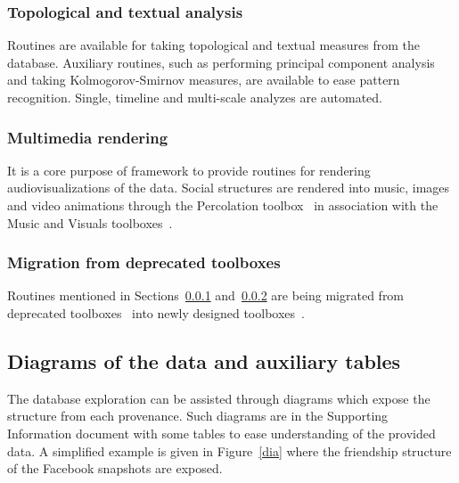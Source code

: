 \documentclass[review]{elsarticle}
\begin{document}
\subsubsection{Topological and textual analysis}\label{ana}
Routines are available for taking topological and textual measures from
the database.
Auxiliary routines, such as performing principal component analysis
and taking Kolmogorov-Smirnov measures, are available
to ease pattern recognition.
Single, timeline and multi-scale analyzes are automated.

\subsubsection{Multimedia rendering}\label{media}
It is a core purpose of framework to provide routines for rendering
audiovisualizations of the data.
Social structures are rendered into music, images and video animations
through the Percolation toolbox~\cite{percolation} in association with
the Music and Visuals toolboxes~\cite{music,visuals}.

\subsubsection{Migration from deprecated toolboxes}
Routines mentioned in Sections~\ref{ana} and~\ref{media} are being migrated from deprecated
toolboxes~\cite{gmaneLegacy,percolationLegacy} into newly designed
toolboxes~\cite{percolation,visuals}.

\subsection{Diagrams of the data and auxiliary tables}
The database exploration can be assisted through diagrams which expose
the structure from each provenance.
Such diagrams are in the Supporting Information document
with some tables to ease understanding of the provided data.
A simplified example is given in Figure~\ref{dia} where the friendship
structure of the Facebook snapshots are exposed.
\end{document}
